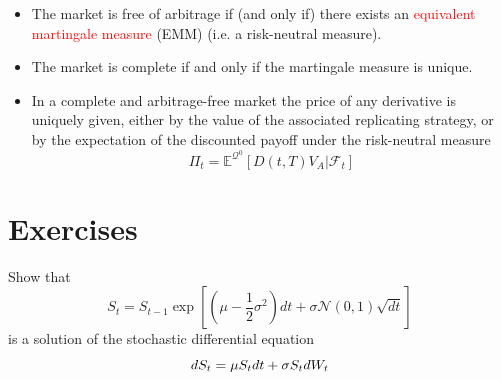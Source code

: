 \documentclass[12pt,a4paper]{book}
\begin{document}
\begin{itemize}
\item The market is free of arbitrage if (and only if) there exists an \textcolor{red}{equivalent martingale measure} (EMM) (i.e. a risk-neutral measure).
\item The market is complete if and only if the martingale measure is unique.
\item In a complete and arbitrage-free market the price of any derivative is uniquely given, either by the value of the associated replicating strategy, or by the expectation of the discounted payoff under the risk-neutral measure
\begin{equation}
\Pi_t = \mathbb{E}^{\mathcal{Q}^0}[D(t,T)V_A|\mathcal{F}_t]
\label{eq:risk_neutral_pricing}
\end{equation}
\end{itemize}

\section*{Exercises}
\begin{exercise}[subtitle={Geometric Brownian Motion}]
Show that 
\begin{equation*}
S_t = S_{t-1}\exp\left[\left(\mu-\frac{1}{2}\sigma^2\right)dt + \sigma\mathcal{N}(0,1)\sqrt{dt}\right] 
\end{equation*}
is a solution of the stochastic differential equation
\begin{equation*}
dS_t = \mu S_t dt + \sigma S_t dW_t \\
\end{equation*}
\end{exercise}
\end{document}
